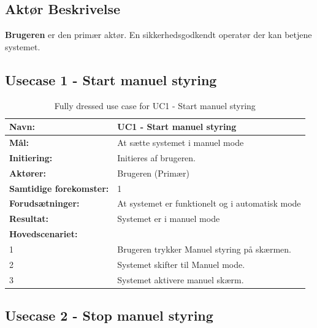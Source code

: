 \subsection{Aktør Beskrivelse}
\textbf{Brugeren} er den primær aktør. En sikkerhedsgodkendt operatør der kan betjene systemet.

\subsection{Usecase 1 - Start manuel styring}
\begin{table}[H]
	\centering
	
	\begin{threeparttable}
		\begin{tabularx}{\linewidth}{ l X }
			\toprule
			\bfseries{Navn:}				& UC1 - Start manuel styring  \\
			\midrule
			\bfseries{Mål:} 				& At sætte systemet i manuel mode \\
			\midrule
			\bfseries{Initiering:} 			& Initieres af brugeren. \\
			\midrule
			\bfseries{Aktører:} 			& Brugeren (Primær) \\
			\midrule
			\bfseries{Samtidige forekomster:} & 1 \\
			\midrule
			\bfseries{Forudsætninger:} 		& At systemet er funktionelt og i automatisk mode\\
			\midrule
			\bfseries{Resultat:} 			& Systemet er i manuel mode \\
			\midrule
			\bfseries{Hovedscenariet:} 	& \\
			
			
			1 	& Brugeren trykker Manuel styring på skærmen.\\
			2	& Systemet skifter til Manuel mode. \\
			3 	& Systemet aktivere manuel skærm. 	\\
			
			\bottomrule
			
		\end{tabularx}
	\end{threeparttable}
	\caption{Fully dressed use case for UC1 - Start manuel styring}
	\label{table:UC1}
\end{table}

\subsection{Usecase 2 - Stop manuel styring}

